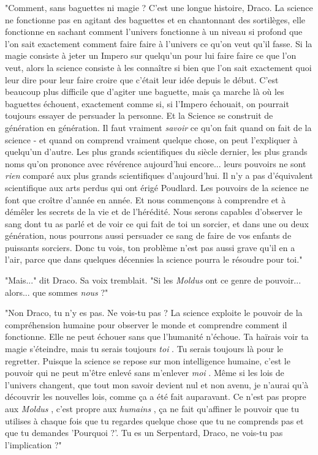 "Comment, sans baguettes ni magie ? C'est une longue histoire, Draco. La science ne fonctionne pas en agitant des baguettes et en chantonnant des sortilèges, elle fonctionne en sachant comment l'univers fonctionne à un niveau si profond que l'on sait exactement comment faire faire à l'univers ce qu'on veut qu'il fasse. Si la magie consiste à jeter un Impero sur quelqu'un pour lui faire faire ce que l'on veut, alors la science consiste à les connaître si bien que l'on sait exactement quoi leur dire pour leur faire croire que c'était leur idée depuis le début. C'est beaucoup plus difficile que d'agiter une baguette, mais ça marche là où les baguettes échouent, exactement comme si, si l'Impero échouait, on pourrait toujours essayer de persuader la personne. Et la Science se construit de génération en génération. Il faut vraiment \emph{savoir}  ce qu'on fait quand on fait de la science - et quand on comprend vraiment quelque chose, on peut l'expliquer à quelqu'un d'autre. Les plus grands scientifiques du siècle dernier, les plus grands noms qu'on prononce avec révérence aujourd'hui encore... leurs pouvoirs ne sont \emph{rien}  comparé aux plus grands scientifiques d'aujourd'hui. Il n'y a pas d'équivalent scientifique aux arts perdus qui ont érigé Poudlard. Les pouvoirs de la science ne font que croître d'année en année. Et nous commençons à comprendre et à démêler les secrets de la vie et de l'hérédité. Nous serons capables d'observer le sang dont tu as parlé et de voir ce qui fait de toi un sorcier, et dans une ou deux génération, nous pourrons aussi persuader ce sang de faire de vos enfants de puissants sorciers. Donc tu vois, ton problème n'est pas aussi grave qu'il en a l'air, parce que dans quelques décennies la science pourra le résoudre pour toi."

"Mais..." dit Draco. Sa voix tremblait. "Si les \emph{Moldus}  ont ce genre de pouvoir... alors... que sommes \emph{nous}  ?"

"Non Draco, tu n'y es pas. Ne vois-tu pas ? La science exploite le pouvoir de la compréhension humaine pour observer le monde et comprendre comment il fonctionne. Elle ne peut échouer sans que l'humanité n'échoue. Ta haïrais voir ta magie s'éteindre, mais tu serais toujours \emph{toi} . Tu serais toujours là pour le regretter. Puisque la science se repose sur mon intelligence humaine, c'est le pouvoir qui ne peut m'être enlevé sans m'enlever \emph{moi} . Même si les lois de l'univers changent, que tout mon savoir devient nul et non avenu, je n'aurai qu'à découvrir les nouvelles lois, comme ça a été fait auparavant. Ce n'est pas propre aux \emph{Moldus} , c'est propre aux \emph{humains} , ça ne fait qu'affiner le pouvoir que tu utilises à chaque fois que tu regardes quelque chose que tu ne comprends pas et que tu demandes 'Pourquoi ?'. Tu es un Serpentard, Draco, ne vois-tu pas l'implication ?"

